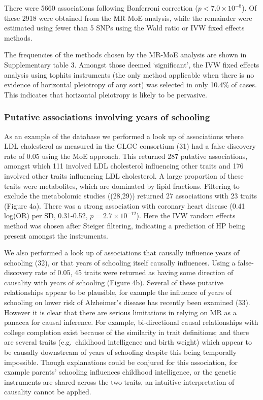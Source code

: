 \documentclass[]{article}
\begin{document}
There were 5660 associations following Bonferroni correction
(\(p < 7.0 \times 10^{-8}\)). Of these 2918 were obtained from the
MR-MoE analysis, while the remainder were estimated using fewer than 5
SNPs using the Wald ratio or IVW fixed effects methods.

The frequencies of the methods chosen by the MR-MoE analysis are shown
in Supplementary table 3. Amongst those deemed `significant', the IVW
fixed effects analysis using tophits instruments (the only method
applicable when there is no evidence of horizontal pleiotropy of any
sort) was selected in only 10.4\% of cases. This indicates that
horizontal pleiotropy is likely to be pervasive.

\subsubsection{Putative associations involving years of
schooling}\label{putative-associations-involving-years-of-schooling}

As an example of the database we performed a look up of associations
where LDL cholesterol as measured in the GLGC consortium (31) had a
false discovery rate of 0.05 using the MoE approach. This returned 287
putative associations, amongst which 111 involved LDL cholesterol
influencing other traits and 176 involved other traits influencing LDL
cholesterol. A large proportion of these traits were metabolites, which
are dominated by lipid fractions. Filtering to exclude the metabolomic
studies ((28,29)) returned 27 associations with 23 traits (Figure 4a).
There was a strong association with coronary heart disease (0.41 log(OR)
per SD, 0.31-0.52, \(p=2.7\times10^{-12}\)). Here the IVW random effects
method was chosen after Steiger filtering, indicating a prediction of HP
being present amongst the instruments.

We also performed a look up of associations that causally influence
years of schooling (32), or that years of schooling itself causally
influences. Using a false-discovery rate of 0.05, 45 traits were
returned as having some direction of causality with years of schooling
(Figure 4b). Several of these putative relationships appear to be
plausible, for example the influence of years of schooling on lower risk
of Alzheimer's disease has recently been examined (33). However it is
clear that there are serious limitations in relying on MR as a panacea
for causal inference. For example, bi-directional causal relationships
with college completion exist because of the similarity in trait
definitions; and there are several traits (e.g.~childhood intelligence
and birth weight) which appear to be causally downstream of years of
schooling despite this being temporally impossible. Though explanations
could be conjured for this association, for example parents' schooling
influences childhood intelligence, or the genetic instruments are shared
across the two traits, an intuitive interpretation of causality cannot
be applied.
\end{document}
